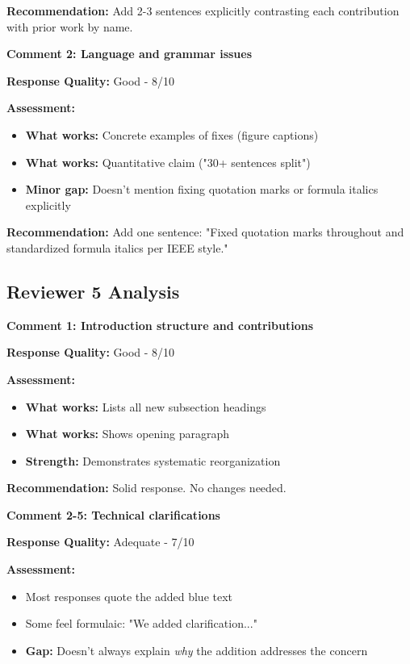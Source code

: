 \documentclass[11pt]{article}
\begin{document}
\textbf{Recommendation:} Add 2-3 sentences explicitly contrasting each contribution with prior work by name.

\vspace{0.3cm}

\textbf{Comment 2: Language and grammar issues}

\textbf{Response Quality:} \textcolor{success}{Good - 8/10}

\textbf{Assessment:}
\begin{itemize}[leftmargin=*]
\item \textbf{What works:} Concrete examples of fixes (figure captions)
\item \textbf{What works:} Quantitative claim ("30+ sentences split")
\item \textbf{Minor gap:} Doesn't mention fixing quotation marks or formula italics explicitly
\end{itemize}

\textbf{Recommendation:} Add one sentence: "Fixed quotation marks throughout and standardized formula italics per IEEE style."

\subsection{Reviewer 5 Analysis}

\textbf{Comment 1: Introduction structure and contributions}

\textbf{Response Quality:} \textcolor{success}{Good - 8/10}

\textbf{Assessment:}
\begin{itemize}[leftmargin=*]
\item \textbf{What works:} Lists all new subsection headings
\item \textbf{What works:} Shows opening paragraph
\item \textbf{Strength:} Demonstrates systematic reorganization
\end{itemize}

\textbf{Recommendation:} Solid response. No changes needed.

\vspace{0.3cm}

\textbf{Comment 2-5: Technical clarifications}

\textbf{Response Quality:} \textcolor{warning}{Adequate - 7/10}

\textbf{Assessment:}
\begin{itemize}[leftmargin=*]
\item Most responses quote the added blue text
\item Some feel formulaic: "We added clarification..."
\item \textbf{Gap:} Doesn't always explain \textit{why} the addition addresses the concern
\end{itemize}
\end{document}
